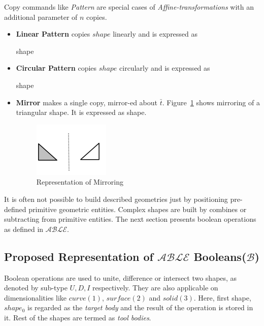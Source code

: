 Copy commands like {\em Pattern} are special cases of {\em Affine-transformations} with an additional parameter of $n$ copies.

\begin{itemize}[noitemsep,topsep=2pt,parsep=2pt,partopsep=2pt]
\item {\bf Linear Pattern} copies $shape$ linearly and is expressed as 

 {shape} 
\item {\bf Circular Pattern} copies $shape$ circularly and is expressed as 

 {shape} 
\item {\bf Mirror} makes a single copy, mirror-ed about $\bar{t}$. Figure~\ref{fig:abstraction:hodamirror} shows mirroring of a triangular shape. It is expressed as 
 {shape}. 

\begin{figure}[!h]
\centering 
\includegraphics[width=0.35\linewidth]{images/hodamirror} 
\caption{Representation of Mirroring}
\label{fig:abstraction:hodamirror}
\end{figure}

\end{itemize}

It is often not possible to build described geometries just by positioning pre-defined primitive geometric entities. Complex shapes are built by combines or subtracting from primitive entities. The next section presents boolean operations as defined in  $\mathcal{ABLE}$.

\subsection{Proposed Representation of $\mathcal{ABLE}$ Booleans($\mathcal{B}$)}


Boolean operations are used to unite, difference or intersect two shapes, as denoted by sub-type $U,D,I$ respectively. They are also applicable on dimensionalities like $curve(1)$, $surface(2)$ and $solid(3)$.  Here, first shape, $shape_0$ is regarded as the {\em target body} and the result of the operation is stored in it. Rest of the shapes are termed as {\em tool bodies}.

